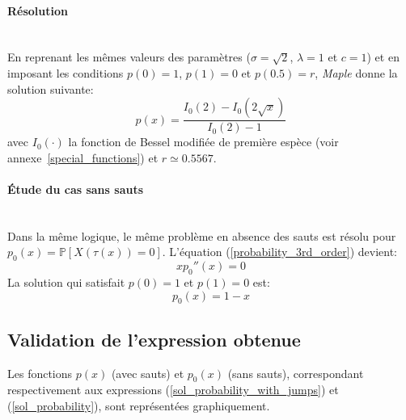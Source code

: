 \paragraph{Résolution}\phantom{}\\
En reprenant les mêmes valeurs des paramètres ($\sigma=\sqrt{2}$, $\lambda=1$ et $c=1$) et en imposant les conditions $p(0)=1$, $p(1)=0$ et $p(0.5)=r$, \textit{Maple} donne la solution suivante:
\begin{equation}\label{sol_probability_with_jumps}
    p(x)=\frac{I_0(2)-I_0(2\sqrt{x})}{I_0(2)-1}
\end{equation}
avec $I_0(\cdot)$ la fonction de Bessel modifiée de première espèce (voir annexe~\ref{special_functions}) et $r\simeq0.5567$.
\paragraph{Étude du cas sans sauts}\phantom{}\\
Dans la même logique, le même problème en absence des sauts est résolu pour $p_0(x)=\mathds{P}[X(\tau(x))=0]$. L'équation (\ref{probability_3rd_order}) devient:
\[
xp_0''(x)=0
\]
La solution qui satisfait $p(0)=1$ et $p(1)=0$ est:
\begin{equation}\label{sol_probability}
    p_0(x)=1-x
\end{equation}
\subsection{Validation de l'expression obtenue}
Les fonctions \( p(x) \) (avec sauts) et \( p_0(x) \) (sans sauts), correspondant respectivement aux expressions (\ref{sol_probability_with_jumps}) et (\ref{sol_probability}), sont représentées graphiquement.
